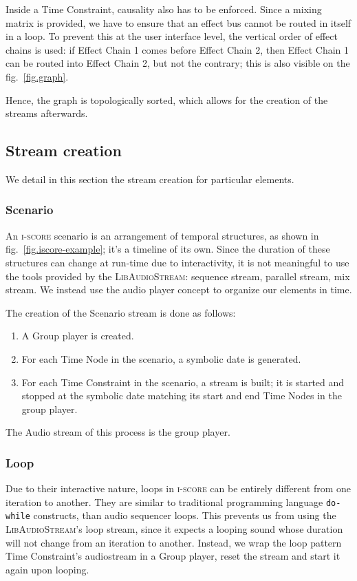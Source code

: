 \documentclass{article}
\newcommand*{\LibAudioStream}{\textsc{LibAudioStream}\xspace}
\newcommand*{\iscore}{\textsc{i-score}\xspace}
\begin{document}

Inside a Time Constraint, causality also has to be enforced. 
Since a mixing matrix is provided, we have to ensure that an effect bus cannot be routed in 
itself in a loop. 
To prevent this at the user interface level, the vertical order of effect chains is used: 
if Effect Chain 1 comes before Effect Chain 2, then Effect Chain 1 can be routed into Effect Chain 2, but not the contrary; this is also visible on the fig.~\ref{fig.graph}.

Hence, the graph is topologically sorted, which allows for the creation of the streams afterwards.


\subsection{Stream creation}
We detail in this section the stream creation for particular elements.
\subsubsection{Scenario}
An \iscore scenario is an arrangement of temporal structures, as shown in fig.~\ref{fig.iscore-example}; it's a timeline of its own.
Since the duration of these structures can change at run-time due to interactivity, it is not meaningful to use the tools provided by the \LibAudioStream: sequence stream, parallel stream, mix stream.
We instead use the audio player concept to organize our elements in time.

The creation of the Scenario stream is done as follows: 
\begin{enumerate}
	\item A Group player is created.
	\item For each Time Node in the scenario, a symbolic date is generated.
	\item For each Time Constraint in the scenario, a stream is built; it is started and stopped at the symbolic date matching its start and end Time Nodes in the group player.
\end{enumerate}

The Audio stream of this process is the group player.

\subsubsection{Loop}
Due to their interactive nature, loops in \iscore can be entirely different from 
one iteration to another. 
They are similar to traditional programming language \texttt{do-while} constructs, than audio sequencer loops.
This prevents us from using the \LibAudioStream's loop stream, since 
it expects a looping sound whose duration will not change from an iteration to another.
Instead, we wrap the loop pattern Time Constraint's audiostream in a Group player, reset the stream and start it again upon looping.
\end{document}
